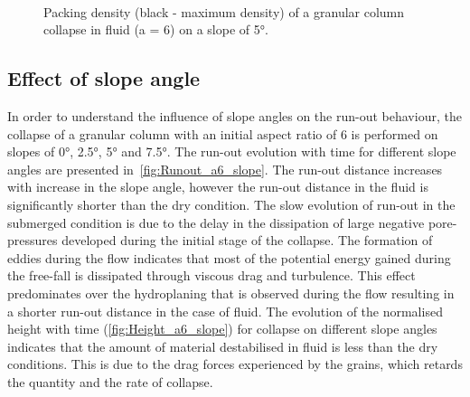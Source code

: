 \documentclass[epj,twocolumn]{webofc}
\begin{document}
\begin{figure}
\\
\caption{Packing density (black - maximum density) of a granular column collapse in fluid (a = 6) on a slope of 5\si{\degree}.}
\label{fig:a6_slope_voro}
\end{figure}

\subsection{Effect of slope angle}
In order to understand the influence of slope angles on the run-out behaviour, 
the collapse of a granular column with an initial aspect ratio of 6 is 
performed on slopes of 0\si{\degree}, 2.5\si{\degree}, 5\si{\degree} and 
7.5\si{\degree}. The run-out evolution with time for different slope angles are 
presented in~\cref{fig:Runout_a6_slope}. The run-out distance increases with 
increase in the slope angle, however the run-out distance in the fluid is 
significantly shorter than the dry condition. The slow evolution of run-out in 
the submerged condition is due to the delay in the dissipation of large 
negative pore-pressures developed during the initial stage of the collapse. The 
formation of eddies during the flow indicates that most of the potential energy 
gained during the free-fall is dissipated through viscous drag and turbulence. 
This effect predominates over the hydroplaning that is observed during 
the flow resulting in a shorter run-out distance in the case of fluid. The 
evolution of the normalised height with time (\cref{fig:Height_a6_slope}) for 
collapse on different slope angles indicates that the 
amount of material destabilised in fluid is less than the dry conditions.
This is due to the drag forces experienced by the grains, which retards the
quantity and the rate of collapse.
\end{document}
